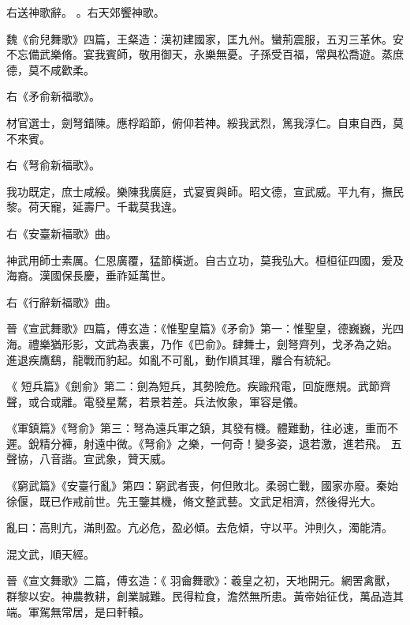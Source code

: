 \begin{pinyinscope}
右送神歌辭。
 。右天郊饗神歌。



 魏《俞兒舞歌》四篇，王粲造：漢初建國家，匡九州。蠻荊震服，五刃三革休。安不忘備武樂脩。宴我賓師，敬用御天，永樂無憂。子孫受百福，常與松喬遊。蒸庶德，莫不咸歡柔。



 右《矛俞新福歌》。



 材官選士，劍弩錯陳。應桴蹈節，俯仰若神。綏我武烈，篤我淳仁。自東自西，莫不來賓。



 右《弩俞新福歌》。



 我功既定，庶士咸綏。樂陳我廣庭，式宴賓與師。昭文德，宣武威。平九有，撫民黎。荷天寵，延壽尸。千載莫我違。



 右《安臺新福歌》曲。



 神武用師士素厲。仁恩廣覆，猛節橫逝。自古立功，莫我弘大。桓桓征四國，爰及海裔。漢國保長慶，垂祚延萬世。



 右《行辭新福歌》曲。



 晉《宣武舞歌》四篇，傅玄造：《惟聖皇篇》《矛俞》第一：惟聖皇，德巍巍，光四海。禮樂猶形影，文武為表裏，乃作《巴俞》。肆舞士，劍弩齊列，戈矛為之始。進退疾鷹鷂，龍戰而豹起。如亂不可亂，動作順其理，離合有統紀。



 《
 短兵篇》《劍俞》第二：劍為短兵，其勢險危。疾踰飛電，回旋應規。武節齊聲，或合或離。電發星騖，若景若差。兵法攸象，軍容是儀。



 《軍鎮篇》《弩俞》第三：弩為遠兵軍之鎮，其發有機。體難動，往必速，重而不遲。銳精分褲，射遠中微。《弩俞》之樂，一何奇！變多姿，退若激，進若飛。
 五聲協，八音諧。宣武象，贊天威。



 《窮武篇》《安臺行亂》第四：窮武者喪，何但敗北。柔弱亡戰，國家亦廢。秦始徐偃，既已作戒前世。先王鑒其機，脩文整武藝。文武足相濟，然後得光大。



 亂曰：高則亢，滿則盈。亢必危，盈必傾。去危傾，守以平。沖則久，濁能清。



 混文武，順天經。



 晉《宣文舞歌》二篇，傅玄造：《
 羽龠舞歌》：羲皇之初，天地開元。網罟禽獸，群黎以安。神農教耕，創業誠難。民得粒食，澹然無所患。黃帝始征伐，萬品造其端。軍駕無常居，是曰軒轅。




\end{pinyinscope}
